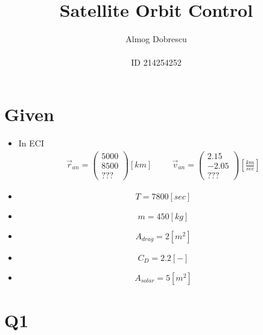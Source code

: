 \documentclass[11pt, a4paper]{article}
\title{Satellite Orbit Control}
\author{Almog Dobrescu\\\\ID 214254252}
\begin{document}
\maketitle

\thispagestyle{empty}
\newpage
\setcounter{page}{1}

\tableofcontents
\vfil
\listoffigures
\newpage

\section{Given}
\begin{itemize}
    \item In ECI
    \begin{align*}
        \vec{r}_{an} = \begin{pmatrix}
            5000\\8500\\???
        \end{pmatrix} [km]
        \hspace{1cm}
        \vec{v}_{an} = \begin{pmatrix}
            2.15\\-2.05\\???
        \end{pmatrix} \left[\frac{km}{sec}\right]
    \end{align*}
    \item $$ T = 7800 [sec] $$
    \item $$ m = 450 [kg] $$
    \item $$ A_{drag} = 2 [m^2]$$
    \item $$ C_D = 2.2 [-]$$
    \item $$ A_{solar} = 5 [m^2]$$
\end{itemize}
\section{Q1}

\newpage
\end{document}
